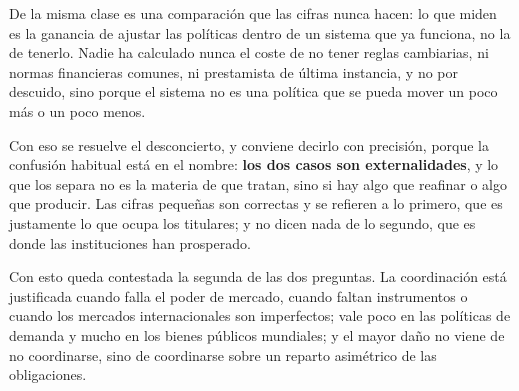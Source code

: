 \documentclass[10pt,a4paper]{article}
\begin{document}
De la misma clase es una comparación que las cifras nunca hacen: lo que miden es la ganancia de ajustar las políticas dentro de un sistema que ya funciona, no la de tenerlo. Nadie ha calculado nunca el coste de no tener reglas cambiarias, ni normas financieras comunes, ni prestamista de última instancia, y no por descuido, sino porque el sistema no es una política que se pueda mover un poco más o un poco menos.

Con eso se resuelve el desconcierto, y conviene decirlo con precisión, porque la confusión habitual está en el nombre: \textbf{los dos casos son externalidades}, y lo que los separa no es la materia de que tratan, sino si hay algo que reafinar o algo que producir. Las cifras pequeñas son correctas y se refieren a lo primero, que es justamente lo que ocupa los titulares; y no dicen nada de lo segundo, que es donde las instituciones han prosperado.


Con esto queda contestada la segunda de las dos preguntas. La coordinación está justificada cuando falla el poder de mercado, cuando faltan instrumentos o cuando los mercados internacionales son imperfectos; vale poco en las políticas de demanda y mucho en los bienes públicos mundiales; y el mayor daño no viene de no coordinarse, sino de coordinarse sobre un reparto asimétrico de las obligaciones. 




\clearpage
\end{document}
